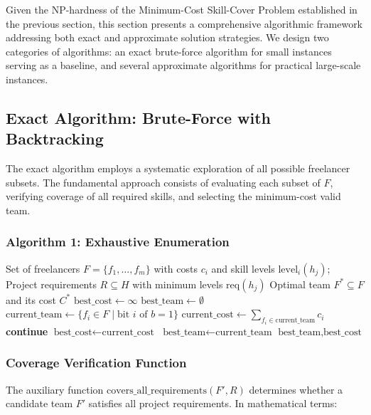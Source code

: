 \documentclass[12pt,a4paper]{article}
\begin{document}
Given the NP-hardness of the Minimum-Cost Skill-Cover Problem established in the previous section, this section presents a comprehensive algorithmic framework addressing both exact and approximate solution strategies. We design two categories of algorithms: an exact brute-force algorithm for small instances serving as a baseline, and several approximate algorithms for practical large-scale instances.

\subsection{Exact Algorithm: Brute-Force with Backtracking}
\label{subsec:exact-algorithm}

The exact algorithm employs a systematic exploration of all possible freelancer subsets. The fundamental approach consists of evaluating each subset of $F$, verifying coverage of all required skills, and selecting the minimum-cost valid team.

\subsubsection{Algorithm 1: Exhaustive Enumeration}
\begin{algorithm}[H]
	\caption{Exact Brute-Force Algorithm for MCSC}
	\label{alg:exact-brute-force}
	\begin{algorithmic}[1]
		\Require Set of freelancers $F = \{f_1, \ldots, f_m\}$ with costs $c_i$ and skill levels $\text{level}_i(h_j)$; Project requirements $R \subseteq H$ with minimum levels $\text{req}(h_j)$
		\Ensure Optimal team $F^* \subseteq F$ and its cost $C^*$
		\State $\text{best\_cost} \gets \infty$
		\State $\text{best\_team} \gets \emptyset$
		\State $\text{current\_team} \gets \{f_i \in F \mid \text{bit } i \text{ of } b = 1\}$
		\State $\text{current\_cost} \gets \sum_{f_i \in \text{current\_team}} c_i$
		\State \textbf{continue} 
		\EndIf
		\State $\text{best\_cost} \gets \text{current\_cost}$
		\State $\text{best\_team} \gets \text{current\_team}$
		\EndIf
		\EndFor
		\State \Return $\text{best\_team}, \text{best\_cost}$
	\end{algorithmic}
\end{algorithm}

\subsubsection{Coverage Verification Function}
The auxiliary function $\text{covers\_all\_requirements}(F', R)$ determines whether a candidate team $F'$ satisfies all project requirements. In mathematical terms:
\end{document}
